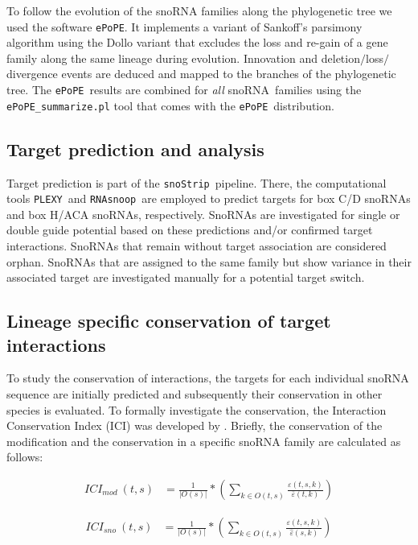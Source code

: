 \documentclass[preprint,3p,times,twocolumn]{elsarticle}
\newcommand{\sno}{snoRNA}
\newcommand{\cd}{box C/D snoRNA}
\newcommand{\haca}{box H/ACA snoRNA}
\newcommand{\snostrip}{\texttt{snoStrip}}
\newcommand{\epope}{\texttt{ePoPE}}
\newcommand{\plexy}{\texttt{PLEXY}}
\newcommand{\snoop}{\texttt{RNAsnoop}}
\begin{document}
To follow the evolution of the snoRNA families along the phylogenetic tree we used the software \epope\cite{Hertel:2015}. 
It implements a variant of Sankoff’s parsimony algorithm using the Dollo variant that excludes the loss and re-gain of a gene family along the same lineage during evolution. 
Innovation and deletion$/$loss$/$divergence events are deduced and mapped to the branches of the phylogenetic tree. 
The \epope\ results are combined for \emph{all} \sno\ families 
using the \texttt{ePoPE\_summarize.pl} tool that comes with the \epope\ distribution.

\subsection{Target prediction and analysis}

Target prediction is part of the \snostrip\ pipeline. There, the computational tools \plexy\ and \snoop\ are employed to predict targets for \cd s and \haca s, respectively. 
SnoRNAs are investigated for single or double guide potential based on these predictions and/or confirmed target interactions. SnoRNAs that remain without target association are considered orphan. SnoRNAs that are assigned to the same family but show variance in their associated target are investigated manually for a potential target switch.


\subsection{Lineage specific conservation of target interactions}
To study the conservation of interactions, the targets for each individual snoRNA sequence are initially predicted and subsequently their conservation in other species is evaluated. To formally investigate the conservation, the Interaction Conservation Index (ICI) was developed by \cite{Kehr:2014}. Briefly, the conservation of the modification and the conservation in a specific snoRNA family are calculated as follows:

\begin{equation}
  \begin{split}
    ICI_{mod}\:(t,s) & = \frac{1}{|O(s)|} * \left( \sum_{k\in O(t,s)} \frac{\varepsilon(t,s,k)}{\bar\varepsilon(t,k)} \right) 
  \end{split}
\end{equation}

\begin{equation}
  \begin{split}
    ICI_{sno}\:(t,s) & = \frac{1}{|O(s)|} * \left( \sum_{k\in O(t,s)} \frac{\varepsilon(t,s,k)}{\hat\varepsilon(s,k)} \right)
  \end{split}
\end{equation}
\end{document}
